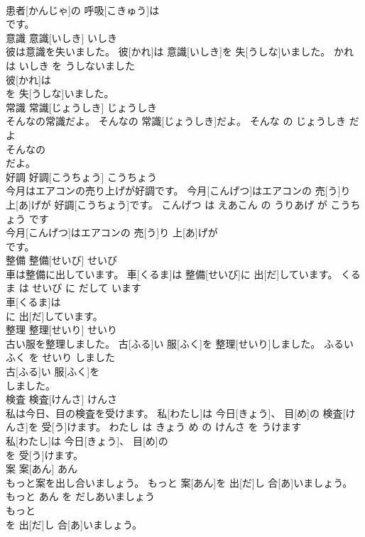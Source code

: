 \documentclass[8pt]{extreport}
\begin{document}
\begin{CJK}{UTF8}{min}
\\	患者[かんじゃ]の 呼吸[こきゅう]は
\\	です。			
\\	意識	意識[いしき]	いしき	
\\	彼は意識を失いました。	彼[かれ]は 意識[いしき]を 失[うしな]いました。	かれ は いしき を うしないました	
\\	彼[かれ]は
\\	を 失[うしな]いました。			
\\	常識	常識[じょうしき]	じょうしき	
\\	そんなの常識だよ。	そんなの 常識[じょうしき]だよ。	そんな の じょうしき だ よ	
\\	そんなの
\\	だよ。			
\\	好調	好調[こうちょう]	こうちょう	
\\	今月はエアコンの売り上げが好調です。	今月[こんげつ]はエアコンの 売[う]り 上[あ]げが 好調[こうちょう]です。	こんげつ は えあこん の うりあげ が こうちょう です	
\\	今月[こんげつ]はエアコンの 売[う]り 上[あ]げが
\\	です。			
\\	整備	整備[せいび]	せいび	
\\	車は整備に出しています。	車[くるま]は 整備[せいび]に 出[だ]しています。	くるま は せいび に だして います	
\\	車[くるま]は
\\	に 出[だ]しています。			
\\	整理	整理[せいり]	せいり	
\\	古い服を整理しました。	古[ふる]い 服[ふく]を 整理[せいり]しました。	ふるい ふく を せいり しました	
\\	古[ふる]い 服[ふく]を
\\	しました。			
\\	検査	検査[けんさ]	けんさ	
\\	私は今日、目の検査を受けます。	私[わたし]は 今日[きょう]、 目[め]の 検査[けんさ]を 受[う]けます。	わたし は きょう め の けんさ を うけます	
\\	私[わたし]は 今日[きょう]、 目[め]の
\\	を 受[う]けます。			
\\	案	案[あん]	あん	
\\	もっと案を出し合いましょう。	もっと 案[あん]を 出[だ]し 合[あ]いましょう。	もっと あん を だしあいましょう	
\\	もっと
\\	を 出[だ]し 合[あ]いましょう。			

\end{CJK}
\end{document}
